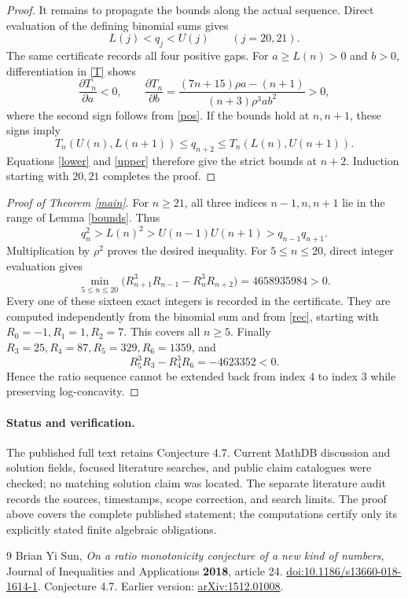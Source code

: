 \documentclass[11pt]{article}
\begin{document}
\begin{proof}
It remains to propagate the bounds along the actual sequence.
Direct evaluation of the defining binomial sums gives
\[
 L(j)<q_j<U(j)\qquad(j=20,21).
\]
The same certificate records all four positive gaps.
For \(a\ge L(n)>0\) and \(b>0\), differentiation in \eqref{T} shows
\[
 \frac{\partial T_n}{\partial a}<0,\qquad
 \frac{\partial T_n}{\partial b}
 =\frac{(7n+15)\rho a-(n+1)}
       {(n+3)\rho^3ab^2}>0,
\]
where the second sign follows from \eqref{pos}.
If the bounds hold at \(n,n+1\), these signs imply
\[
 T_n(U(n),L(n+1))\le q_{n+2}
                  \le T_n(L(n),U(n+1)).
\]
Equations \eqref{lower} and \eqref{upper} therefore give the strict
bounds at \(n+2\). Induction starting with \(20,21\) completes the proof.
\end{proof}

\begin{proof}[Proof of Theorem \ref{main}]
For \(n\ge21\), all three indices \(n-1,n,n+1\) lie in the range of
Lemma \ref{bounds}. Thus
\[
 q_n^2>L(n)^2>U(n-1)U(n+1)>q_{n-1}q_{n+1}.
\]
Multiplication by \(\rho^2\) proves the desired inequality.
For \(5\le n\le20\), direct integer evaluation gives
\[
 \min_{5\le n\le20}
  \bigl(R_{n+1}^3R_{n-1}-R_n^3R_{n+2}\bigr)=4658935984>0.
\]
Every one of these sixteen exact integers is recorded in the
certificate. They are computed independently from the binomial sum
and from \eqref{rec}, starting with \(R_0=-1,R_1=1,R_2=7\).
This covers all \(n\ge5\).
Finally \(R_3=25,R_4=87,R_5=329,R_6=1359\), and
\[
 R_5^3R_3-R_4^3R_6=-4623352<0.
\]
Hence the ratio sequence cannot be extended back from index \(4\)
to index \(3\) while preserving log-concavity.
\end{proof}

\paragraph{Status and verification.}
The published full text retains Conjecture 4.7.
Current MathDB discussion and solution fields, focused literature
searches, and public claim catalogues were checked; no matching
solution claim was located. The separate literature audit records
the sources, timestamps, scope correction, and search limits.
The proof above covers the complete published statement; the
computations certify only its explicitly stated finite algebraic
obligations.

\begin{thebibliography}{9}
Brian Yi Sun,
\emph{On a ratio monotonicity conjecture of a new kind of numbers},
Journal of Inequalities and Applications \textbf{2018}, article 24.
\href{https://doi.org/10.1186/s13660-018-1614-1}{doi:10.1186/s13660-018-1614-1}.
Conjecture 4.7.
Earlier version: \href{https://arxiv.org/abs/1512.01008}{arXiv:1512.01008}.
\end{thebibliography}
\end{document}
